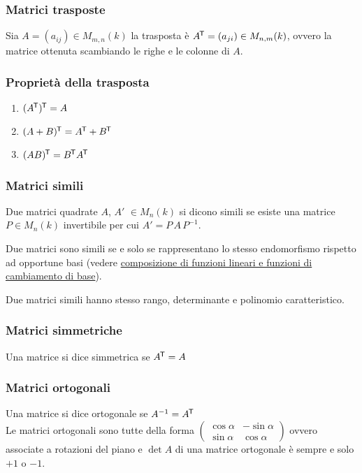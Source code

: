 \documentclass[a4paper]{article}
\newcommand\tran{^{\mkern-1.5mu\mathsf{T}}} %
\begin{document}
\subsubsection*{Matrici trasposte}
Sia \(A = (a_{ij}) \in M_{m,n}(k)\) la trasposta è \(A\tran = (a_{ji}) \in M_{n,m}(k)\), ovvero la matrice ottenuta scambiando le
righe e le colonne di \(A\).

\subsubsection*{Proprietà della trasposta}
\begin{enumerate}
	\item \((A\tran)\tran = A\)
	\item \((A+B)\tran = A\tran + B\tran\)
	\item \((AB)\tran = B\tran A\tran\)
\end{enumerate}

\subsubsection*{Matrici simili}
Due matrici quadrate \(A\), \(A'\) \(\in M_n(k)\) si dicono simili se esiste una matrice \(P \in M_n(k)\) invertibile per cui
\(A' = P \, A \, P^{-1}\).

Due matrici sono simili se e solo se rappresentano lo stesso endomorfismo rispetto ad opportune basi (vedere
\hyperlink{composizioneFunzioniCambiamentiDiBase}{composizione di funzioni lineari e funzioni di cambiamento di base}).

Due matrici simili hanno stesso rango, determinante e polinomio caratteristico.

\subsubsection*{Matrici simmetriche}
Una matrice si dice simmetrica se \(A \tran = A\)

\subsubsection*{Matrici ortogonali}
Una matrice si dice ortogonale se \(A^{-1} = A\tran\) \\
Le matrici ortogonali sono tutte della forma \(\left( \begin{matrix} \cos \alpha & - \sin \alpha \\ \sin \alpha & \cos \alpha \end{matrix} \right)\)
ovvero associate a rotazioni del piano e \(\det A\) di una matrice ortogonale è sempre e solo  \(+1\) o \(-1\).
\end{document}
